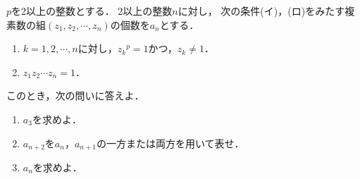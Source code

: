 \documentclass[../../main.tex]{subfiles}
\begin{document}
$p$を2以上の整数とする．
2以上の整数$n$に対し，
次の条件(イ)，(ロ)をみたす複素数の組$(z_1,z_2,\cdots,z_n)$の個数を$a_n$とする．
\begin{enumerate}
  \item[(イ)] $k=1,2,\cdots,n$に対し，${z_k}^p=1$かつ，$z_k\neq1$．
  \item[(ロ)] $z_1z_2\cdots z_n=1$．
\end{enumerate}
このとき，次の問いに答えよ．
\begin{enumerate}
  \item $a_3$を求めよ．
  \item $a_{n+2}$を$a_n$，$a_{n+1}$の一方または両方を用いて表せ．
  \item $a_n$を求めよ．
\end{enumerate}
\end{document}
